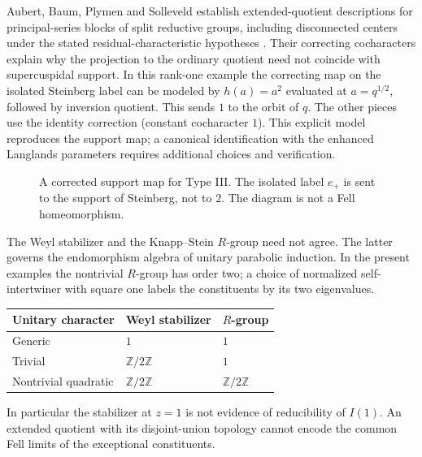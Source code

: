 Aubert, Baum, Plymen and Solleveld establish extended-quotient descriptions for principal-series blocks of split reductive groups, including disconnected centers under the stated residual-characteristic hypotheses \cite[Sections 15, 18--19]{ABPS17}. Their correcting cocharacters explain why the projection to the ordinary quotient need not coincide with supercuspidal support. In this rank-one example the correcting map on the isolated Steinberg label can be modeled by $h(a)=a^2$ evaluated at $a=q^{1/2}$, followed by inversion quotient. This sends $1$ to the orbit of $q$. The other pieces use the identity correction (constant cocharacter $1$). This explicit model reproduces the support map; a canonical identification with the enhanced Langlands parameters requires additional choices and verification.
\begin{figure}[htbp]\centering
{}
\caption{A corrected support map for Type III. The isolated label $e_+$ is sent to the support of Steinberg, not to $2$. The diagram is not a Fell homeomorphism.}\label{fig:correcting-map}
\end{figure}

The Weyl stabilizer and the Knapp--Stein $R$-group need not agree. The latter governs the endomorphism algebra of unitary parabolic induction. In the present examples the nontrivial $R$-group has order two; a choice of normalized self-intertwiner with square one labels the constituents by its two eigenvalues.
\begin{center}\small
\begin{tabular}{@{}lll@{}}\toprule
Unitary character & Weyl stabilizer & $R$-group\\\midrule
Generic & $1$ & $1$\\
Trivial & $\mathbb Z/2\mathbb Z$ & $1$\\
Nontrivial quadratic & $\mathbb Z/2\mathbb Z$ & $\mathbb Z/2\mathbb Z$\\\bottomrule
\end{tabular}\end{center}
In particular the stabilizer at $z=1$ is not evidence of reducibility of $I(1)$. An extended quotient with its disjoint-union topology cannot encode the common Fell limits of the exceptional constituents.

